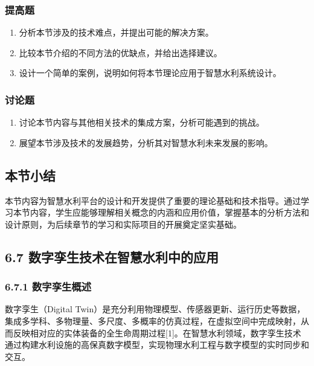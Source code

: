 \subsubsection{提高题}\label{ux63d0ux9ad8ux9898-6}

\begin{enumerate}
\def\labelenumi{\arabic{enumi}.}
\setcounter{enumi}{3}
\tightlist
\item
  分析本节涉及的技术难点，并提出可能的解决方案。
\item
  比较本节介绍的不同方法的优缺点，并给出选择建议。
\item
  设计一个简单的案例，说明如何将本节理论应用于智慧水利系统设计。
\end{enumerate}

\subsubsection{讨论题}\label{ux8ba8ux8bbaux9898-6}

\begin{enumerate}
\def\labelenumi{\arabic{enumi}.}
\setcounter{enumi}{6}
\tightlist
\item
  讨论本节内容与其他相关技术的集成方案，分析可能遇到的挑战。
\item
  展望本节涉及技术的发展趋势，分析其对智慧水利未来发展的影响。
\end{enumerate}

\subsection{本节小结}\label{ux672cux8282ux5c0fux7ed3-5}

本节内容为智慧水利平台的设计和开发提供了重要的理论基础和技术指导。通过学习本节内容，学生应能够理解相关概念的内涵和应用价值，掌握基本的分析方法和设计原则，为后续章节的学习和实际项目的开展奠定坚实基础。

\subsection{6.7 数字孪生技术在智慧水利中的应用}\label{ux6570ux5b57ux5b6aux751fux6280ux672fux5728ux667aux6167ux6c34ux5229ux4e2dux7684ux5e94ux7528}

\subsubsection{6.7.1 数字孪生概述}\label{ux6570ux5b57ux5b6aux751fux6982ux8ff0}

数字孪生（Digital Twin）是充分利用物理模型、传感器更新、运行历史等数据，集成多学科、多物理量、多尺度、多概率的仿真过程，在虚拟空间中完成映射，从而反映相对应的实体装备的全生命周期过程{[}1{]}。在智慧水利领域，数字孪生技术通过构建水利设施的高保真数字模型，实现物理水利工程与数字模型的实时同步和交互。

